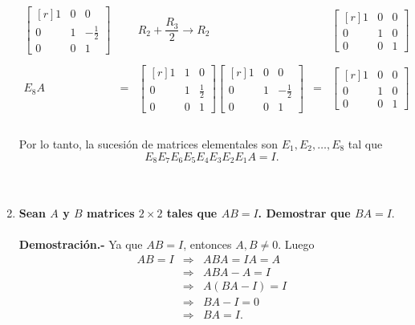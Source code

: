 \begin{enumerate}
    $$\begin{array}{rcccc}
	\begin{bmatrix*}[r]
	    1 & 0 & 0\\
	    0 & 1 & -\frac{1}{2}\\
	    0 & 0 & 1 
	\end{bmatrix*} && R_2+\dfrac{R_3}{2}\to R_2 & &
	\begin{bmatrix*}[r]
	    1 & 0 & 0\\
	    0 & 1 & 0\\
	    0 & 0 & 1 
	\end{bmatrix*} \\\\
	E_8A&=&\begin{bmatrix*}[r]
	    1 & 1 & 0\\
	    0 & 1 & \frac{1}{2}\\
	    0 & 0 & 1 
	\end{bmatrix*} 
	\begin{bmatrix*}[r]
	    1 & 0 & 0\\
	    0 & 1 & -\frac{1}{2}\\
	    0 & 0 & 1 
	\end{bmatrix*} &=& 
	\begin{bmatrix*}[r]
	    1 & 0 & 0\\
	    0 & 1 & 0\\
	    0 & 0 & 1 
	\end{bmatrix*} \\\\
    \end{array}$$

    Por lo tanto, la sucesión de matrices elementales son $E_1,E_2,\ldots , E_8$ tal que
    $$E_8 E_7 E_6 E_5 E_4 E_3 E_2 E_1 A = I.$$\\\\

    \item \textbf{\boldmath Sean $A$ y $B$ matrices $2\times 2$ tales que $AB=I$. Demostrar que $BA=I.$\\\\
	Demostración.-}\; Ya que $AB=I$, entonces $A,B\neq 0.$ Luego
	$$\begin{array}{rcl}
	    AB=I &\Rightarrow & ABA = IA = A\\
		 &\Rightarrow & ABA-A = I\\
		 &\Rightarrow & A(BA-I) = I\\
		 &\Rightarrow & BA-I = 0\\	
		 &\Rightarrow & BA = I.
	\end{array}$$
	\vspace{0.5cm}


\end{enumerate}
